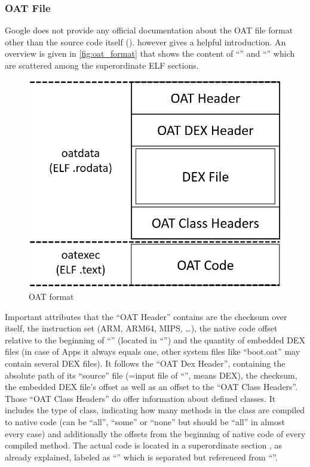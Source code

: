\subsubsection{OAT File}\label{section:oat_file}
Google does not provide any official documentation about the OAT
file format other than the source code itself
(). \parencite{hiding_behind_art}
however gives a helpful introduction. An overview is given
in \autoref{fig:oat_format} that shows the content of ``'' and
``'' which are scattered among the superordinate ELF sections.

\begin{figure}[htb]
  \centering
  \includegraphics[scale=0.4]{figures/oat_format}
  \caption[OAT format]{OAT format}
  \label{fig:oat_format}
\end{figure}

Important attributes that the ``OAT Header'' contains are the
checksum over itself,
the instruction set (ARM, ARM64, MIPS, \ldots), the native code
offset relative to the beginning of ``'' (located in
``'') and the quantity of embedded
DEX files (in case of Apps it always equals one, other system files like
``boot.oat'' may contain several DEX files). It follows the
``OAT Dex Header'', containing
the absolute path of its ``source'' file (=input file of ``'',
means DEX), the checksum, the
embedded DEX file's offset as well as
an offset to the ``OAT Class Headers''. Those ``OAT Class Headers''
do offer information about defined classes. It includes the type
of class, indicating how many methods in the class
are compiled to native code (can be ``all'', ``some'' or ``none'' but
should be ``all'' in almost every case) and additionally
the offsets from the beginning of native code of every compiled method.
The actual code is located in a superordinate section
, as already explained, labeled as ``'' which is separated but referenced from ``''.

